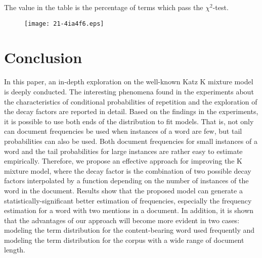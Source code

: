 \documentclass[english]{jnlp_1.4_rep}
\begin{document}
\begin{table}[t]

\vspace{4pt}\small
The value in the table is the percentage of terms which pass the $\chi^{2}$-test.
\par
\end{table}

\begin{figure}[t]
\begin{center}
\texttt{[image: 21-4ia4f6.eps]}
\end{center}
\label{model comparison using descriptive statistics}
\end{figure}


\section{Conclusion}

In this paper, an in-depth exploration on the well-known Katz K mixture model is deeply conducted. The interesting phenomena found in the
experiments about the characteristics of conditional probabilities of repetition and the exploration of the decay factors are reported in detail.
Based on the findings in the experiments, it is possible to use both ends of the distribution to fit models. That is, not only can document
frequencies be used when instances of a word are few, but tail probabilities can also be used. Both document frequencies for small instances of a
word and the tail probabilities for large instances are rather easy to estimate empirically. Therefore, we propose an effective approach for
improving the K mixture model, where the decay factor is the combination of two possible decay factors interpolated by a function depending on the
number of instances of the word in the document. Results show that the proposed model can generate a statistically-significant better estimation of
frequencies, especially the frequency estimation for a word with two mentions in a document. In addition, it is shown that the advantages of our
approach will become more evident in two cases: modeling the term distribution for the content-bearing word used frequently and modeling the term
distribution for the corpus with a wide range of document length.

\vspace{-0.5\Cvs}
\acknowledgment
\end{document}
